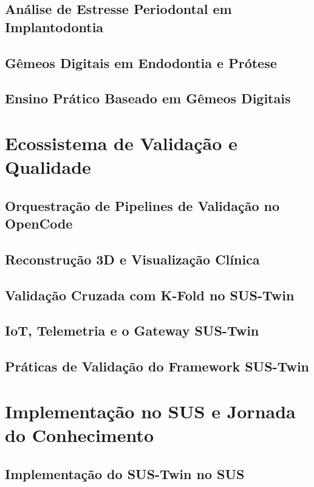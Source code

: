\documentclass[12pt,a4paper,oneside,openright]{abntex2}
\begin{document}
\chapter{Análise de Estresse Periodontal em Implantodontia}

\chapter{Gêmeos Digitais em Endodontia e Prótese} \label{ch:endodontia}

\chapter{Ensino Prático Baseado em Gêmeos Digitais}


\part{Ecossistema de Validação e Qualidade}
\chapter{Orquestração de Pipelines de Validação no OpenCode}

\chapter{Reconstrução 3D e Visualização Clínica}

\chapter{Validação Cruzada com K-Fold no SUS-Twin}

\chapter{IoT, Telemetria e o Gateway SUS-Twin}

\chapter{Práticas de Validação do Framework SUS-Twin} \label{ch:praticas}


\part{Implementação no SUS e Jornada do Conhecimento}
\chapter{Implementação do SUS-Twin no SUS} \label{ch:impacto}

\end{document}
